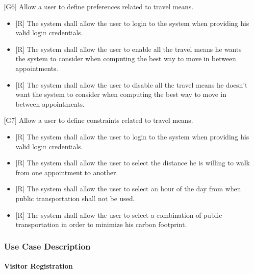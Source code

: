 \documentclass[12pt]{article}
\begin{document}
{[G6]} Allow a user to define preferences related to travel means.
\begin{itemize}
    \item{[R]} The system shall allow the user to login to the system when providing his valid login credentials.
    \item{[R]} The system shall allow the user to enable all the travel means he wants the system to consider when computing the best way to move in between appointments.
    \item{[R]} The system shall allow the user to disable all the travel means he doesn't want the system to consider when computing the best way to move in between appointments.
\end{itemize}
{[G7]} Allow a user to define constraints related to travel means.
\begin{itemize}
    \item{[R]} The system shall allow the user to login to the system when providing his valid login credentials.
    \item{[R]} The system shall allow the user to select the distance he is willing to walk from one appointment to another.
    \item{[R]} The system shall allow the user to select an hour of the day from when public transportation shall not be used.
    \item{[R]} The system shall allow the user to select a combination of public transportation in order to minimize his carbon footprint.
\end{itemize}


\subsubsection{Use Case Description}
\paragraph{Visitor Registration}
\end{document}
